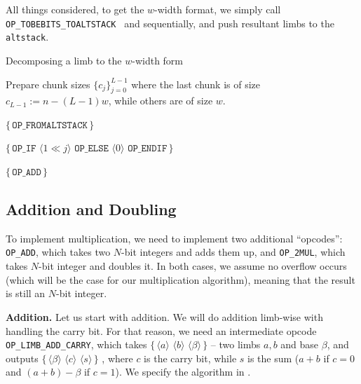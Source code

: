 \documentclass{iacrtrans}
\newcommand{\elem}[1]{\, \langle #1 \rangle \,}
\newcommand{\opcode}[1]{\, \texttt{#1} \,}
\newcommand{\script}[1]{ $\big\{ #1 \big\}$ }
\begin{document}
All things considered, to get the $w$-width format, we simply call \opcode{OP\_TOBEBITS\_TOALTSTACK} and  sequentially, and push resultant limbs to the \texttt{altstack}.

\begin{algorithm}
\caption{Decomposing a limb to the $w$-width form}\label{alg:script_to_windowed_form}

Prepare chunk sizes $\{c_j\}_{j=0}^{L-1}$ where the last chunk is of size $c_{L-1} := n - (L-1)w$, while others are of size $w$.

 {
     {
        \script{\opcode{OP\_FROMALTSTACK}}

        \script{\opcode{OP\_IF} \elem{1 \ll j} \opcode{OP\_ELSE} \elem{0} \opcode{OP\_ENDIF}}
    }

     {
        \script{\opcode{OP\_ADD}}
    }
}
\end{algorithm}

\subsection{Addition and Doubling}

To implement multiplication, we need to implement two additional ``opcodes'': \texttt{OP\_ADD}, which takes two $N$-bit integers and adds them up, and \texttt{OP\_2MUL}, which takes $N$-bit integer and doubles it. In both cases, we assume no overflow occurs (which will be the case for our multiplication algorithm), meaning that the result is still an $N$-bit integer. 

\textbf{Addition.} Let us start with addition. We will do addition limb-wise with handling the carry bit. For that reason, we need an intermediate opcode \texttt{OP\_LIMB\_ADD\_CARRY}, which takes \script{\elem{a} \elem{b} \elem{\beta}} -- two limbs $a,b$ and base $\beta$, and outputs \script{\elem{\beta} \elem{c} \elem{s}}, where $c$ is the carry bit, while $s$ is the sum ($a+b$ if $c=0$ and $(a+b)-\beta$ if $c=1$). We specify the algorithm in .
\end{document}
